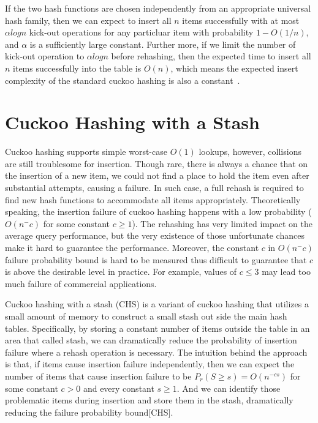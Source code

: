 \documentclass[12pt,conference,compsoc]{IEEEtran}
\begin{document}
If the two hash functions are chosen independently from an appropriate universal hash family, then we can expect to insert all $n$ items successfully with at most $\alpha logn$ kick-out operations for any particluar item with probability $1-O(1/n)$, and $\alpha$ is a sufficiently large constant. Further more, if we limit the number of kick-out operation to $\alpha logn$ before rehashing, then the expected time to insert all $n$ items successfully into the table is $O(n)$, which means the expected insert complexity of the standard cuckoo hashing is also a constant~\cite{cuckoo}.

\section{Cuckoo Hashing with a Stash}
\label{sec:chs}
Cuckoo hashing supports simple worst-case $O(1)$ lookups, however, collisions are still troublesome for insertion. Though rare, there is always a chance that on the insertion of a new item, we could not find a place to hold the item even after substantial attempts, causing a failure. In such case, a full rehash is required to find new hash functions to accommodate all items appropriately. Theoretically speaking, the insertion failure of cuckoo hashing happens with a low probability ($O(n^-c)$ for some constant $c\geq 1$). The rehashing has very limited impact on the average query performance, but the very existence of those unfortunate chances make it hard to guarantee the performance. Moreover, the constant $c$ in $O(n^-c)$ failure probability bound is hard to be measured thus difficult to guarantee that $c$ is above the desirable level in practice. For example, values of $c\leq3$ may lead too much failure of commercial applications.

Cuckoo hashing with a stash (CHS) is a variant of cuckoo hashing that utilizes a small amount of memory to construct a small stash out side the main hash tables. Specifically, by storing a constant number of items outside the table in an area that called stash, we can dramatically reduce the probability of insertion failure where a rehash operation is necessary. The intuition behind the approach is that, if items cause insertion failure independently, then we can expect the number of items that cause insertion failure to be \textbf{$P_r$}$(S\geq s)=O(n^{-cs})$ for some constant $c>0$ and every constant $s\geq 1$. And we can identify those problematic items during insertion and store them in the stash, dramatically reducing the failure probability bound[CHS].
\end{document}
